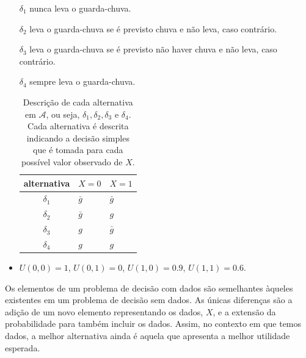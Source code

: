 \begin{example}
\begin{itemize}
  $\delta_{1}$ nunca leva o guarda-chuva.
										
  $\delta_{2}$ leva o guarda-chuva se 
  é previsto chuva e não leva, caso contrário.
  
  $\delta_{3}$ leva o guarda-chuva se é previsto
  não haver chuva e não leva, caso contrário.
  
  $\delta_{4}$ sempre leva o guarda-chuva.
  \begin{table}
   \centering
   \begin{tabular}{|c|l|l|}
    \hline
    alternativa & $X=0$ & $X=1$ \\
	\hline
	$\delta_{1}$ & $\bar{g}$ & $\bar{g}$ \\
	$\delta_{2}$ & $\bar{g}$ & $g$ \\
	$\delta_{3}$ & $g$ & $\bar{g}$ \\
	$\delta_{4}$ & $g$ & $g$ \\
	\hline
   \end{tabular}
   \caption{Descrição de cada alternativa em
   $\mathcal{A}$, ou seja,
   $\delta_{1}, \delta_{2}, \delta_{3}$ e 
   $\delta_{4}$. Cada alternativa é 
   descrita indicando a decisão simples que
   é tomada para cada possível valor 
   observado de $X$.}
   \label{ex:chuva-dados}
  \end{table}
  \item $U(0,0) = 1$, 
  $U(0,1) = 0$, $U(1,0) = 0.9$, $U(1,1) = 0.6$.	 
 \end{itemize}
\end{example}

Os elementos de um problema de decisão com dados
são semelhantes àqueles existentes em um problema de decisão sem dados.
As únicas diferenças são a adição de um novo elemento
representando os dados, $X$, e 
a extensão da probabilidade para também incluir os dados.
Assim, no contexto em que temos dados,
a melhor alternativa ainda é aquela que
apresenta a melhor utilidade esperada.


